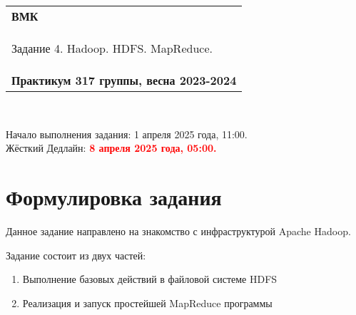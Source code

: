 \documentclass[10pt,fleqn]{article}
\begin{document}
\begin{center}
    \begin{tabular}{|p{17.5cm}|}
        \hline
        \textbf{ВМК}\\
        \begin{center} \Large Задание 4. Hadoop. HDFS. MapReduce. \end{center}\\
        \textbf{Практикум 317 группы, весна 2023-2024}\\
        \hline
    \end{tabular}
\end{center}

\

\begin{tabbing}
    Начало выполнения задания: 1 апреля 2025 года, 11:00.\\
    Жёсткий Дедлайн: \textcolor{red}{\bf 8 апреля 2025 года, 05:00.}
\end{tabbing}


\section*{Формулировка задания}
Данное задание направлено на знакомство с инфраструктурой Apache Hadoop.


Задание состоит из двух частей:
\begin{enumerate}
 \item Выполнение базовых действий в файловой системе HDFS
 \item Реализация и запуск простейшей MapReduce программы
\end{enumerate}
\end{document}

